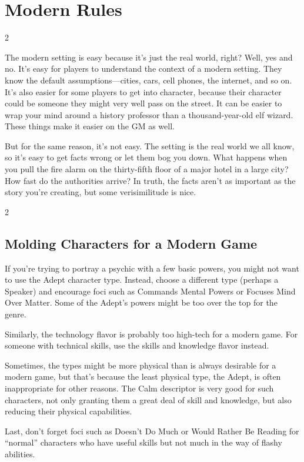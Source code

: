 \part{Modern Rules}

\begin{multicols}{2}

The modern setting is easy because it’s just the real world, right? Well, yes and no. It’s easy for players to understand the context of a modern setting. They know the default assumptions—cities, cars, cell phones, the internet, and so on. It’s also easier for some players to get into character, because their character could be someone they might very well pass on the street. It can be easier to wrap your mind around a history professor than a thousand-year-old elf wizard. These things make it easier on the GM as well. 

But for the same reason, it’s not easy. The setting is the real world we all know, so it’s easy to get facts wrong or let them bog you down. What happens when you pull the fire alarm on the thirty-fifth floor of a major hotel in a large city? How fast do the authorities arrive? In truth, the facts aren’t as important as the story you’re creating, but some verisimilitude is nice.

\newpage

\end{multicols}

\begin{multicols}{2}

\chapter{Molding Characters for a Modern Game}

If you’re trying to portray a psychic with a few basic powers, you might not want to use the Adept character type. Instead, choose a different type (perhaps a Speaker) and encourage foci such as Commands Mental Powers or Focuses Mind Over Matter. Some of the Adept’s powers might be too over the top for the genre.

Similarly, the technology flavor is probably too high-tech for a modern game. For someone with technical skills, use the skills and knowledge flavor instead.

Sometimes, the types might be more physical than is always desirable for a modern game, but that’s because the least physical type, the Adept, is often inappropriate for other reasons. The Calm descriptor is very good for such characters, not only granting them a great deal of skill and knowledge, but also reducing their physical capabilities.

Last, don’t forget foci such as Doesn’t Do Much or Would Rather Be Reading for “normal” characters who have useful skills but not much in the way of flashy abilities.

\end{multicols}

